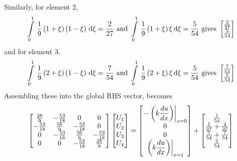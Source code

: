 Similarly, for element $2$,  
\begin{equation*}
  \gint{0}{1}{\dfrac{1}{9}\pbrac{1+\xi}\pbrac{1-\xi}}{\xi}=\dfrac{2}{27}
  \mbox{ and }\gint{0}{1}{\dfrac{1}{9}\pbrac{1+\xi}\xi}{\xi}=\dfrac{5}{54}
  \mbox{ gives }
  \begin{bmatrix}  
    \frac{2}{27} \\
    \frac{5}{54}
  \end{bmatrix}
\end{equation*}
and for element $3$,
\begin{equation*}
  \gint{0}{1}{\dfrac{1}{9}\pbrac{2+\xi}\pbrac{1-\xi}}{\xi}=\dfrac{7}{54}
  \mbox{ and }\gint{0}{1}{\dfrac{1}{9}\pbrac{2+\xi}\xi}{\xi}=\dfrac{5}{54}
  \mbox{ gives }
  \begin{bmatrix}
    \frac{7}{54} \\
    \frac{5}{54}
  \end{bmatrix}
\end{equation*}
Assembling these into the global RHS vector,  becomes
\begin{equation*}
  \begin{bmatrix}
    \frac{28}{9} & -\frac{53}{18} & 0 & 0 \\
    -\frac{53}{18} & \frac{56}{9} & -\frac{53}{18} & 0 \\
    0 & -\frac{53}{18} & \frac{56}{9} & -\frac{53}{18} \\
    0 & 0 &-\frac{53}{18} & \frac{28}{9}
  \end{bmatrix}
  \begin{bmatrix}
    U_{1} \\
    U_{2} \\
    U_{3} \\
    U_{4}
  \end{bmatrix} =
  \begin{bmatrix}
    - \left. \left( k \dfrac{ d u}{d x}  \right) \right|_{x=0}  \\
    0 \\
    0 \\
     \left. \left( k \dfrac{ d u}{d x}  \right) \right|_{x=1} 
  \end{bmatrix} + 
  \begin{bmatrix}
    \frac{1}{54} \\
    \frac{1}{27} + \frac{2}{27} \\
    \frac{5}{54}+\frac{7}{54} \\
    \frac{5}{54}
  \end{bmatrix}
\end{equation*}

